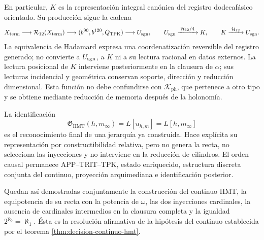 En particular, \(K\) es la representación integral canónica del registro
dodecafásico orientado. Su producción sigue la cadena
\[
 X_{\rm term}\longrightarrow\mathcal R_{12}(X_{\rm term})
 \longrightarrow(b^{90},b^{120},Q_{\rm TPK})
 \longrightarrow U_{\rm sgn},
 \qquad
 U_{\rm sgn}\xrightarrow{\;\mathcal H_{12}/4\;}K,
 \qquad
 K\xrightarrow{\;\mathcal H_{12}\;}U_{\rm sgn}.
\]
La equivalencia de Hadamard expresa una coordenatización reversible del
registro generado; no convierte a \(U_{\rm sgn}\), a \(K\) ni a su lectura
racional en datos externos. La lectura posicional de \(K\) interviene
posteriormente en la clausura de \(\alpha\); sus lecturas incidencial y
geométrica conservan soporte, dirección y reducción dimensional. Esta función
no debe confundirse con \(\mathcal K_{\mathrm{ph}}\), que pertenece a otro
tipo y se obtiene mediante reducción de memoria después de la holonomía.

La identificación
\[
 \mathfrak G_{\mathrm{HMT}}(h,m_\infty)
 =L[u_{h,m}]=L[h,m_\infty]
\]
es el reconocimiento final de una jerarquía ya construida. Hace explícita su
representación por constructibilidad relativa, pero no genera la recta, no
selecciona las inyecciones y no interviene en la reducción de cilindros. El
orden causal permanece APP--TRIT--TPK, estado enriquecido, estructura discreta
conjunta del continuo, proyección arquimediana e identificación posterior.

Quedan así demostradas conjuntamente la construcción del continuo HMT, la
equipotencia de su recta con la potencia de \(\omega\), las dos inyecciones
cardinales, la ausencia de cardinales intermedios en la clausura completa y la
igualdad \(2^{\aleph_0}=\aleph_1\). Ésta es la resolución afirmativa de la
hipótesis del continuo establecida por el teorema
\ref{thm:decision-continuo-hmt}.

\endgroup
